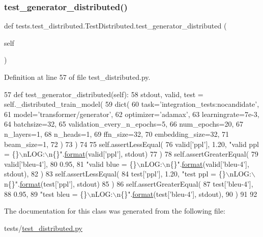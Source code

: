 \subsubsection{\texorpdfstring{test\+\_\+generator\+\_\+distributed()}{test\_generator\_distributed()}}
{\footnotesize\ttfamily def tests.\+test\+\_\+distributed.\+Test\+Distributed.\+test\+\_\+generator\+\_\+distributed (\begin{DoxyParamCaption}\item[{}]{self }\end{DoxyParamCaption})}



Definition at line 57 of file test\+\_\+distributed.\+py.


\begin{DoxyCode}
57     \textcolor{keyword}{def }test\_generator\_distributed(self):
58         stdout, valid, test = self.\_distributed\_train\_model(
59             dict(
60                 task=\textcolor{stringliteral}{'integration\_tests:nocandidate'},
61                 model=\textcolor{stringliteral}{'transformer/generator'},
62                 optimizer=\textcolor{stringliteral}{'adamax'},
63                 learningrate=7e-3,
64                 batchsize=32,
65                 validation\_every\_n\_epochs=5,
66                 num\_epochs=20,
67                 n\_layers=1,
68                 n\_heads=1,
69                 ffn\_size=32,
70                 embedding\_size=32,
71                 beam\_size=1,
72             )
73         )
74 
75         self.assertLessEqual(
76             valid[\textcolor{stringliteral}{'ppl'}], 1.20, \textcolor{stringliteral}{"valid ppl = \{\}\(\backslash\)nLOG:\(\backslash\)n\{\}"}.\hyperlink{namespaceparlai_1_1chat__service_1_1services_1_1messenger_1_1shared__utils_a32e2e2022b824fbaf80c747160b52a76}{format}(valid[\textcolor{stringliteral}{'ppl'}], stdout)
77         )
78         self.assertGreaterEqual(
79             valid[\textcolor{stringliteral}{'bleu-4'}],
80             0.95,
81             \textcolor{stringliteral}{"valid blue = \{\}\(\backslash\)nLOG:\(\backslash\)n\{\}"}.\hyperlink{namespaceparlai_1_1chat__service_1_1services_1_1messenger_1_1shared__utils_a32e2e2022b824fbaf80c747160b52a76}{format}(valid[\textcolor{stringliteral}{'bleu-4'}], stdout),
82         )
83         self.assertLessEqual(
84             test[\textcolor{stringliteral}{'ppl'}], 1.20, \textcolor{stringliteral}{"test ppl = \{\}\(\backslash\)nLOG:\(\backslash\)n\{\}"}.\hyperlink{namespaceparlai_1_1chat__service_1_1services_1_1messenger_1_1shared__utils_a32e2e2022b824fbaf80c747160b52a76}{format}(test[\textcolor{stringliteral}{'ppl'}], stdout)
85         )
86         self.assertGreaterEqual(
87             test[\textcolor{stringliteral}{'bleu-4'}],
88             0.95,
89             \textcolor{stringliteral}{"test bleu = \{\}\(\backslash\)nLOG:\(\backslash\)n\{\}"}.\hyperlink{namespaceparlai_1_1chat__service_1_1services_1_1messenger_1_1shared__utils_a32e2e2022b824fbaf80c747160b52a76}{format}(test[\textcolor{stringliteral}{'bleu-4'}], stdout),
90         )
91 
92 
\end{DoxyCode}


The documentation for this class was generated from the following file\+:\begin{DoxyCompactItemize}
\item 
tests/\hyperlink{test__distributed_8py}{test\+\_\+distributed.\+py}\end{DoxyCompactItemize}
